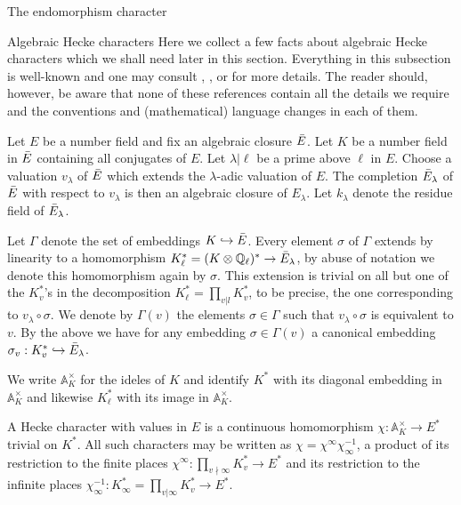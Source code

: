\documentclass[11pt,a4paper]{article}
\begin{document}
\begin{section}{The endomorphism character}
\label{section_endo_char}
\begin{subsection}{Algebraic Hecke characters}
\label{subsection_Alg_Heck_chars}
Here we collect a few facts about algebraic Hecke characters which we shall need later in this section. 
Everything in this subsection is well-known and one may consult \cite{Periods_of_Hecke_characters}, \cite{Chai_Conrad_Oort}, or \cite{Serre72} for more details.
The reader should, however, be aware that none of these references contain all the details we require and the conventions and (mathematical) language changes in each of them. 


Let $E$ be a number field and fix an algebraic closure $\Bar{E}$. Let $K$ be a number field in $\Bar{E}$ containing all conjugates of $E$. Let $\lambda |\ell$ be a prime above $\ell$ in $E$.
 Choose a valuation $v_\lambda$ of $\Bar{E}$ which extends the $\lambda$-adic valuation of $E$. 
 The completion $\Bar{E}_\lambda$ of $\Bar{E}$ with respect to $v_\lambda$ is then an algebraic closure of $E_\lambda$.
 Let $k_\lambda$ denote the residue field of $\Bar{E}_\lambda$.

Let $\Gamma$ denote the set of embeddings  $K \hookrightarrow \Bar{E}$. Every element $\sigma$ of $\Gamma$ extends by linearity to a homomorphism $K_\ell^* = (K\otimes \mathbb{Q}_\ell)^* \rightarrow \Bar{E}_\lambda$, by abuse of notation we denote this homomorphism again by $\sigma$. This extension is trivial on all but one of the $K_v^*$'s in the decomposition $K_\ell^* = \prod_{v|l} K_v^*$, to be precise, the one corresponding to $v_\lambda \circ \sigma$. We denote by $\Gamma(v)$ the elements $\sigma \in \Gamma$ such that $v_\lambda \circ \sigma$ is equivalent to $v$. By the above we have for any embedding $\sigma \in \Gamma(v)$ a canonical embedding $\sigma_v:K^*_v \hookrightarrow \Bar{E}_\lambda$.

We write $\mathbb{A}_K^\times$ for the ideles of $K$ and identify $K^*$ with its diagonal embedding in $\mathbb{A}_K^\times$ and likewise $K_\ell^*$ with its image in $\mathbb{A}_K^\times$.


A Hecke character with values in $E$ is a continuous homomorphism $\chi: \mathbb{A}_K^\times \rightarrow E^*$ trivial on $K^*$. All such characters may be written as $\chi = \chi^\infty\chi_\infty^{-1}$, a product of its restriction to the finite places $\chi^\infty:  \prod_{v\nmid \infty} K^*_v \rightarrow E^*$ and its restriction to the infinite places $\chi_\infty^{-1}: K^*_\infty = \prod_{v| \infty} K^*_v \rightarrow E^*$.


\end{subsection}
\end{section}
\end{document}
